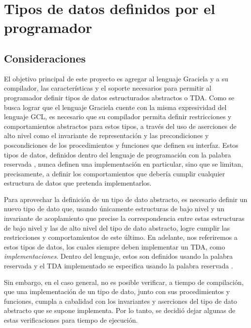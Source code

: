 {{%
\section{Tipos de datos definidos por el programador}


\subsection{Consideraciones}

El objetivo principal de este proyecto es agregar al lenguaje Graciela y a su
compilador, las características y el soporte necesarios para permitir al
programador definir tipos de datos estructurados abstractos o TDA. Como se busca
lograr que el lenguaje Graciela cuente con la misma expresividad del lenguaje
GCL, es necesario que su compilador permita definir restricciones y
comportamientos abstractos para estos tipos, a través del uso de aserciones de
alto nivel como el invariante de representación y las precondiciones y
poscondiciones de los procedimientos y funciones que definen su interfaz.
Estos tipos de datos, definidos dentro del lenguaje de programación con la
palabra reservada , nunca definen una implementación en
particular, sino que se limitan, precisamente, a definir los comportamientos que
debería cumplir cualquier estructura de datos que pretenda implementarlos.

Para aprovechar la definición de un tipo de dato abstracto, es necesario definir
un nuevo tipo de dato que, usando únicamente estructuras de bajo nivel y un
invariante de acoplamiento que precise la correspondencia entre estas
estructuras de bajo nivel y las de alto nivel del tipo de dato abstracto, logre
cumplir las restricciones y comportamientos de este último. En adelante, nos
referiremos a estos tipos de datos, los cuales siempre deben implementar un TDA,
como \textit{implementaciones}. Dentro del lenguaje, estos son definidos usando
la palabra reservada  y el TDA implementado se especifica usando la
palabra reservada .

Sin embargo, en el caso general, no es posible verificar, a tiempo de
compilación, que una implementación de un tipo de dato, junto con sus
procedimientos y funciones, cumpla a cabalidad con los invariantes y aserciones
del tipo de dato abstracto que se supone implementa. Por lo tanto, se decidió
dejar algunas de estas verificaciones para tiempo de ejecución.

}}
